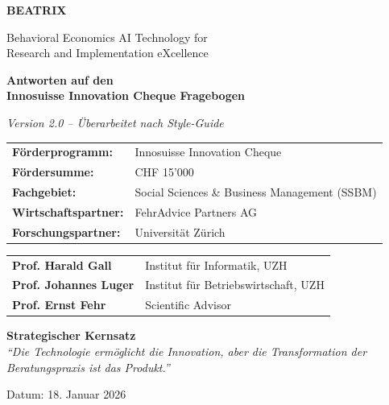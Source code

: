 \documentclass[11pt,a4paper]{article}
\begin{document}
\begin{titlepage}
    \centering
    \vspace*{1.5cm}

    {\Huge\bfseries\color{innosuisse} BEATRIX\par}
    \vspace{0.5cm}
    {\Large Behavioral Economics AI Technology for\\Research and Implementation eXcellence\par}

    \vspace{1.5cm}

    {\LARGE\bfseries Antworten auf den\\Innosuisse Innovation Cheque Fragebogen\par}

    \vspace{0.5cm}
    {\large\textit{Version 2.0 -- Überarbeitet nach Style-Guide}\par}

    \vspace{1.5cm}

    \begin{tabular}{ll}
        \textbf{Förderprogramm:} & Innosuisse Innovation Cheque \\
        \textbf{Fördersumme:} & CHF 15'000 \\
        \textbf{Fachgebiet:} & Social Sciences \& Business Management (SSBM) \\
        \textbf{Wirtschaftspartner:} & FehrAdvice Partners AG \\
        \textbf{Forschungspartner:} & Universität Zürich \\
    \end{tabular}

    \vspace{1.5cm}

    \begin{tabular}{ll}
        \textbf{Prof. Harald Gall} & Institut für Informatik, UZH \\
        \textbf{Prof. Johannes Luger} & Institut für Betriebswirtschaft, UZH \\
        \textbf{Prof. Ernst Fehr} & Scientific Advisor \\
    \end{tabular}

    \vfill

    \begin{tcolorbox}[colback=lightgray, colframe=innosuisse, width=0.9\textwidth]
    \centering
    \textbf{Strategischer Kernsatz}\\[0.3em]
    \textit{``Die Technologie ermöglicht die Innovation, aber die Transformation der Beratungspraxis ist das Produkt.''}
    \end{tcolorbox}

    \vspace{1cm}

    {\large Datum: 18. Januar 2026\par}
\end{titlepage}
\end{document}
